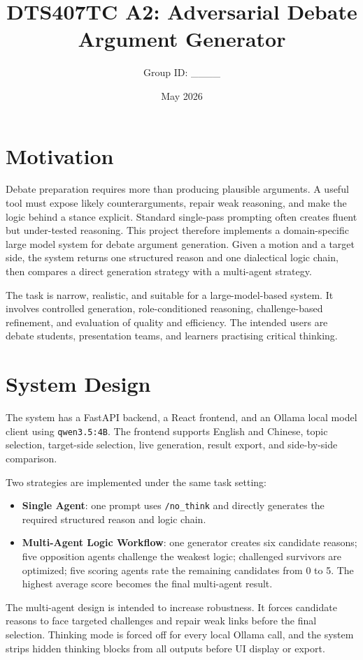 \documentclass[11pt]{article}
\title{DTS407TC A2: Adversarial Debate Argument Generator}
\author{Group ID: \_\_\_\_}
\date{May 2026}
\begin{document}
\maketitle

\section{Motivation}
Debate preparation requires more than producing plausible arguments. A useful tool must expose likely counterarguments, repair weak reasoning, and make the logic behind a stance explicit. Standard single-pass prompting often creates fluent but under-tested reasoning. This project therefore implements a domain-specific large model system for debate argument generation. Given a motion and a target side, the system returns one structured reason and one dialectical logic chain, then compares a direct generation strategy with a multi-agent strategy.

The task is narrow, realistic, and suitable for a large-model-based system. It involves controlled generation, role-conditioned reasoning, challenge-based refinement, and evaluation of quality and efficiency. The intended users are debate students, presentation teams, and learners practising critical thinking.

\section{System Design}
The system has a FastAPI backend, a React frontend, and an Ollama local model client using \texttt{qwen3.5:4B}. The frontend supports English and Chinese, topic selection, target-side selection, live generation, result export, and side-by-side comparison.

Two strategies are implemented under the same task setting:

\begin{itemize}
\item \textbf{Single Agent}: one prompt uses \texttt{/no\_think} and directly generates the required structured reason and logic chain.
\item \textbf{Multi-Agent Logic Workflow}: one generator creates six candidate reasons; five opposition agents challenge the weakest logic; challenged survivors are optimized; five scoring agents rate the remaining candidates from 0 to 5. The highest average score becomes the final multi-agent result.
\end{itemize}

The multi-agent design is intended to increase robustness. It forces candidate reasons to face targeted challenges and repair weak links before the final selection. Thinking mode is forced off for every local Ollama call, and the system strips hidden thinking blocks from all outputs before UI display or export.
\end{document}
